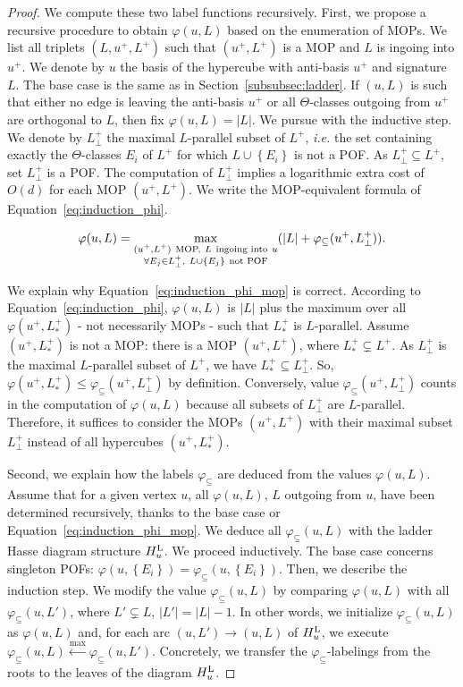 \documentclass[a4paper,UKenglish,numberwithinsect,cleveref, autoref,anonymous]{lipics-v2021}
\newcommand{\set}[1]{\left\{ #1 \right\}}
\newcommand{\card}[1]{\left| #1 \right|}
\newcommand{\hul}{H_u^{\mbox{\scriptsize{L}}}}
\newcommand{\varphis}{\varphi_{\subseteq}}
\begin{document}
\begin{proof}
We compute these two label functions recursively. First, we propose a recursive procedure to obtain $\varphi(u,L)$ based on the enumeration of MOPs. We list all triplets $(L,u^+,L^+)$ such that $(u^+,L^+)$ is a MOP and $L$ is ingoing into $u^+$. We denote by $u$ the basis of the hypercube with anti-basis $u^+$ and signature $L$. 
The base case is the same as in Section~\ref{subsubsec:ladder}. If $(u,L)$ is such that either no edge is leaving the anti-basis $u^+$ or all $\Theta$-classes outgoing from $u^+$ are orthogonal to $L$, then fix $\varphi(u,L) = \card{L}$. 
We pursue with the inductive step. We denote by $L_{\perp}^+$ the maximal $L$-parallel subset of $L^+$, {\em i.e.} the set containing exactly the $\Theta$-classes $E_i$ of $L^+$ for which $L \cup \set{E_i}$ is not a POF. As $L_{\perp}^+ \subseteq L^+$, set $L_{\perp}^+$ is a POF. The computation of $L_{\perp}^+$ implies a logarithmic extra cost of $O(d)$ for each MOP $(u^+,L^+)$. We write the MOP-equivalent formula of Equation~\eqref{eq:induction_phi}.

\begin{equation}
     \varphi(u,L) = \max\limits_{\substack{(u^+,L^+) ~\mbox{\scriptsize{MOP,}}~ L ~\mbox{\scriptsize{ingoing into}}~ u  \\ \forall E_j \in L_{\perp}^+,~ L \cup \set{E_j} ~\mbox{\scriptsize{not POF}}}} (\card{L} + \varphis(u^+,L_{\perp}^+)).
    \label{eq:induction_phi_mop}
\end{equation}

We explain why Equation~\eqref{eq:induction_phi_mop} is correct. According to Equation~\eqref{eq:induction_phi}, $\varphi(u,L)$ is $\card{L}$ plus the maximum over all $\varphi(u^+,L_*^+)$ - not necessarily MOPs - such that $L_*^+$ is $L$-parallel. Assume $(u^+,L_*^+)$ is not a MOP: there is a MOP $(u^+,L^+)$, where $L_*^+ \subsetneq L^+$. As $L_{\perp}^+$ is the maximal $L$-parallel subset of $L^+$, we have $L_*^+ \subseteq L_{\perp}^+$. So, $\varphi(u^+,L_*^+) \le \varphis(u^+,L_{\perp}^+)$ by definition. Conversely, value $\varphis(u^+,L_{\perp}^+)$ counts in the computation of $\varphi(u,L)$ because all subsets of $L_{\perp}^+$ are $L$-parallel. Therefore, it suffices to consider the MOPs $(u^+,L^+)$ with their maximal subset $L_{\perp}^+$ instead of all hypercubes $(u^+,L_*^+)$.

Second, we explain how the labels $\varphis$ are deduced from the values $\varphi(u,L)$. Assume that for a given vertex $u$, all $\varphi(u,L)$, $L$ outgoing from $u$, have been determined recursively, thanks to the base case or Equation~\eqref{eq:induction_phi_mop}. We deduce all $\varphis(u,L)$ with the ladder Hasse diagram structure $\hul$. We proceed inductively. The base case concerns singleton POFs: $\varphi(u,\set{E_i}) = \varphis(u,\set{E_i})$. Then, we describe the induction step. We modify the value $\varphis(u,L)$ by comparing $\varphi(u,L)$ with all $\varphis(u,L')$, where $L' \subsetneq L$, $\card{L'} = \card{L} -1$. In other words, we initialize $\varphis(u,L)$ as $\varphi(u,L)$ and, for each arc $(u,L')\rightarrow (u,L)$ of $\hul$, we execute $\varphis(u,L) \xleftarrow{\max} \varphis(u,L')$. Concretely, we transfer the $\varphis$-labelings from the roots to the leaves of the diagram $\hul$.


\end{proof}
\end{document}
